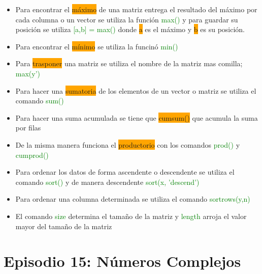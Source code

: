 \documentclass{article}
\begin{document}
	\begin{itemize}
		
	\item Para encontrar el \colorbox{orange}{máximo} de una matriz entrega el resultado del máximo por cada columna o un vector se utiliza la función \textcolor{green}{max()} y para guardar su posición se utiliza \textcolor{green}{[a,b] = max()} donde \colorbox{orange}{a} es el máximo y \colorbox{orange}{b} es su posición.

	\item Para encontrar el \colorbox{orange}{mínimo} se utiliza la funcinó \textcolor{green}{min()}
	
	\item Para \colorbox{orange}{trasponer} una matriz se utiliza el nombre de la matriz mas comilla; \textcolor{green}{max(y')}
	
	\item Para hacer una \colorbox{orange}{sumatoria} de los elementos de un vector o matriz se utiliza el comando \textcolor{green}{sum()}
	
	\item Para hacer una suma acumulada se tiene que \colorbox{orange}{cumsum()} que acumula la suma por filas
	
	\item De la misma manera funciona el \colorbox{orange}{productorio} con los comandos \textcolor{green}{prod()} y \textcolor{green}{cumprod()}
	
	\item Para ordenar los datos de forma ascendente o descendente se utiliza el comando \textcolor{green}{sort()} y de manera descendente \textcolor{green}{sort(x, 'descend')}
	
	\item Para ordenar una columna determinada se utiliza el comando \textcolor{green}{sortrows(y,n)}
	
	\item El comando \textcolor{green}{size} determina el tamaño de la matriz y \textcolor{green}{length} arroja el valor mayor del tamaño de la matriz
	
	\end{itemize}
	\section{Episodio 15: Números Complejos}
	
\end{document}
